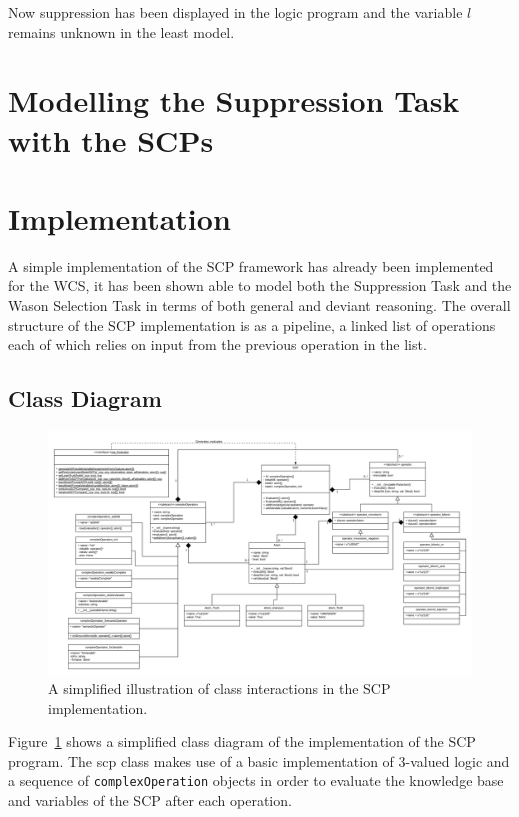 \documentclass{article}
\begin{document}
Now suppression has been displayed in the logic program and the variable $l$ remains unknown in the least model.

\section{Modelling the Suppression Task with the SCPs}


\section{Implementation}
A simple implementation of the SCP framework has already been implemented for the WCS, it has been shown able to model both the Suppression Task and the Wason Selection Task in terms of both general and deviant reasoning. The overall structure of the SCP implementation is as a pipeline, a linked list of operations each of which relies on input from the previous operation in the list.

\subsection{Class Diagram}

\begin{figure}
    \centering \includegraphics[width=\textwidth]{scpClassDiagram}
    \caption{A simplified illustration of class interactions in the SCP implementation.}
    \label{fig:classDiagram}
\end{figure}

Figure~\ref{fig:classDiagram} shows a simplified class diagram of the implementation of the SCP program. The scp class makes use of a basic implementation of 3-valued logic and a sequence of \texttt{complexOperation} objects in order to evaluate the knowledge base and variables of the SCP after each operation.
\end{document}
